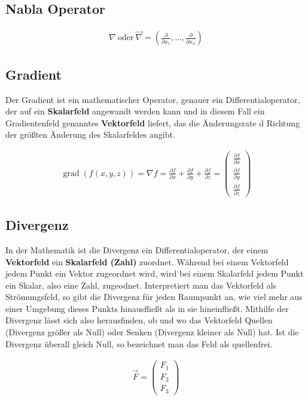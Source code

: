 \documentclass[a4paper]{scrartcl}
\begin{document}
\subsection{Nabla Operator}

\begin{align}
\nabla \: \mathrm{oder} \: \vec \nabla = \left (\frac\partial{\partial
x_1},\ldots, \frac\partial{\partial x_n}\right)
\end{align}
\subsection{Gradient}
Der Gradient ist ein mathematischer Operator, genauer ein Differentialoperator,
der auf ein \textbf{Skalarfeld} angewandt werden kann und in diesem Fall ein
Gradientenfeld genanntes \textbf{Vektorfeld} liefert, das die Änderungsrate d
Richtung der größten Änderung des Skalarfeldes angibt.

\begin{align}
\operatorname{grad}(f(x,y,z)) = \nabla f = \frac{{\partial f}}{{\partial x}} +
\frac{{\partial f}}{{\partial y}} + \frac{{\partial f}}{{\partial z}} = 
\begin{pmatrix} \frac{\partial f}{\partial x} \\ \frac{\partial f}{\partial
y} \\ \frac{\partial f}{\partial z} \end{pmatrix}
\end{align}

\subsection{Divergenz}
In der Mathematik ist die Divergenz ein Differentialoperator, der einem
\textbf{Vektorfeld} ein \textbf{Skalarfeld (Zahl)} zuordnet. Während bei einem
Vektorfeld jedem Punkt ein Vektor zugeordnet wird, wird bei einem Skalarfeld jedem Punkt ein Skalar, also
eine Zahl, zugeodnet. Interpretiert man das Vektorfeld als Strömungsfeld, so
gibt die Divergenz für jeden Raumpunkt an, wie viel mehr aus einer Umgebung
dieses Punkts hinausfließt als in sie hineinfließt. Mithilfe der Divergenz lässt
sich also herausfinden, ob und wo das Vektorfeld Quellen (Divergenz größer als
Null) oder Senken (Divergenz kleiner als Null) hat. Ist die Divergenz überall
gleich Null, so bezeichnet man das Feld als quellenfrei.

\begin{align}
\vec F = \begin{pmatrix} F_1 \\ F_2 \\ F_3 \end{pmatrix}
\end{align}
\end{document}
